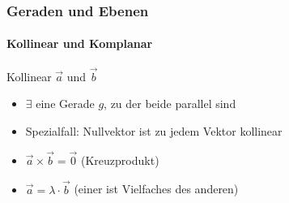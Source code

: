 \raggedcolumns


\subsubsection*{Geraden und Ebenen}

\paragraph*{Kollinear und Komplanar}   

\begin{definition}{Kollinear} $\vec{a}$ und $\vec{b}$\\
    \begin{minipage}{0.8\linewidth}
    \begin{itemize}
        \item $\exists$ eine Gerade $g$, zu der beide parallel sind
        \item Spezialfall: Nullvektor ist zu jedem Vektor kollinear
        \item $\vec{a} \times \vec{b} = \vec{0}$ (Kreuzprodukt)
        \item $\vec{a}=\lambda\cdot\vec{b}$ (einer ist Vielfaches des anderen)
    \end{itemize}
    \end{minipage}
    \hspace{3mm}
    \begin{minipage}{0.1\linewidth}

\end{minipage}
\end{definition}

